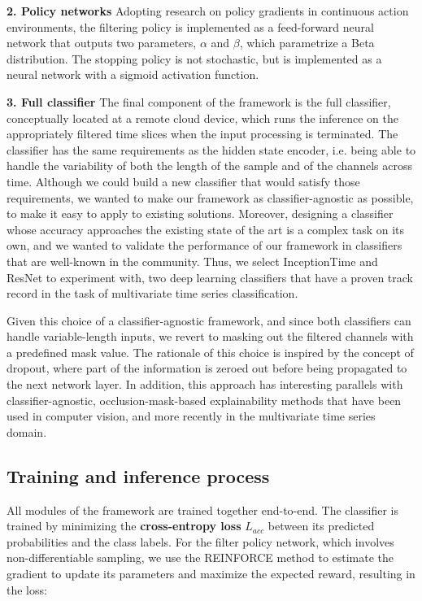 \documentclass[conference]{IEEEtran}
\begin{document}
\textbf{2. Policy networks} Adopting research on policy gradients in continuous action environments\cite{chou17beta}, the filtering policy is implemented as a feed-forward neural network that outputs two parameters, $\alpha$ and $\beta$, which parametrize a Beta distribution. The stopping policy is not stochastic, but is implemented as a neural network with a sigmoid activation function.


 \textbf{3. Full classifier} The final component of the framework is the full classifier, conceptually located at a remote cloud device, which runs the inference on the appropriately filtered time slices when the input processing is terminated. The classifier has the same requirements as the hidden state encoder, i.e. being able to handle the variability of both the length of the sample and of the channels across time. Although we could build a new classifier that would satisfy those requirements, we wanted to make our framework as classifier-agnostic as possible, to make it easy to apply to existing solutions. Moreover, designing a classifier whose accuracy approaches the existing state of the art is a complex task on its own, and we wanted to validate the performance of our framework in classifiers that are well-known in the community. Thus, we select InceptionTime\cite{ismail2020inceptiontime} and ResNet\cite{wang2017resnet} to experiment with, two deep learning classifiers that have a proven track record in the task of multivariate time series classification\cite{ruizGreatMultivariateTime2021}.
 
 Given this choice of a classifier-agnostic framework, and since both classifiers can handle variable-length inputs, we revert to masking out the filtered channels with a predefined mask value. The rationale of this choice is inspired by the concept of dropout\cite{srivastava14dropout}, where part of the information is zeroed out before being propagated to the next network layer. In addition, this approach has interesting parallels with classifier-agnostic, occlusion-mask-based explainability methods that have been used in computer vision\cite{petsiuk2018rise}, and more recently in the multivariate time series domain\cite{crabbe2021dynamask,mercier2022timereise}.

 \subsection{Training and inference process}

All modules of the framework are trained together end-to-end. The classifier is trained by minimizing the \textbf{cross-entropy loss} $L_{acc}$ between its predicted probabilities and the class labels. For the filter policy network, which involves non-differentiable sampling, we use the REINFORCE method\cite{williams1992simple} to estimate the gradient to update its parameters and maximize the expected reward,
resulting in the loss\cite{schulman2015high}:
\end{document}
